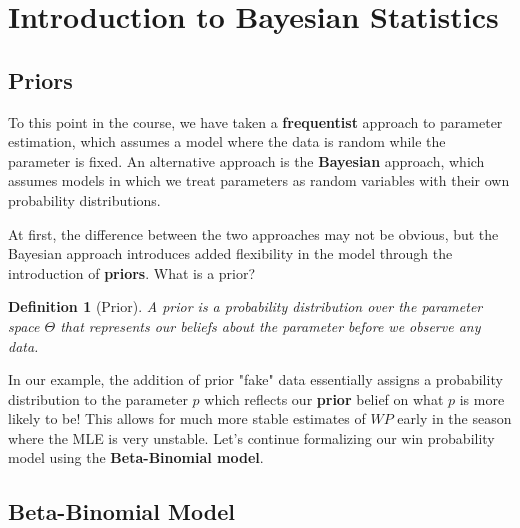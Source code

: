\documentclass[twoside]{article}
\newtheorem{definition}[theorem]{Definition}
\theoremstyle{definition}
\begin{document}
\section{Introduction to Bayesian Statistics}

\subsection{Priors}

To this point in the course, we have taken a \textbf{frequentist} approach to parameter estimation, which assumes a model where the data is random while the parameter is fixed. An alternative approach is the \textbf{Bayesian} approach, which assumes models in which we treat parameters as random variables with their own probability distributions.

At first, the difference between the two approaches may not be obvious, but the Bayesian approach introduces added flexibility in the model through the introduction of \textbf{priors}. What is a prior?
\begin{definition}[Prior]
    A prior is a probability distribution over the parameter space $\Theta$ that represents our beliefs about the parameter before we observe any data.
\end{definition}
In our example, the addition of prior "fake" data essentially assigns a probability distribution to the parameter $p$ which reflects our \textbf{prior} belief on what $p$ is more likely to be! This allows for much more stable estimates of $WP$ early in the season where the MLE is very unstable. Let's continue formalizing our win probability model using the \textbf{Beta-Binomial model}.

\subsection{Beta-Binomial Model}
\end{document}
